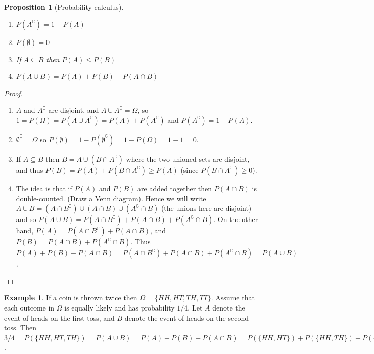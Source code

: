 \documentclass[a4paper,leqno]{article}
\numberwithin{equation}{section}
\newtheorem{prp}[equation]{Proposition}
\theoremstyle{definition}
\newtheorem{ex}[equation]{Example}
\theoremstyle{remark}
\newcommand{\union}{\cup}
\newcommand{\inter}{\cap}
\begin{document}
\begin{prp}[Probability calculus]\label{prp:probcalc}\leavevmode
  \begin{enumerate}
    \item $ P(A^\complement) = 1 - P(A) $
    \item $ P(\emptyset) = 0 $
    \item If $ A \subseteq B $ then $ P(A) \leq P(B) $
    \item $ P(A \union B) = P(A) + P(B) - P(A \inter B) $
  \end{enumerate}
\end{prp}
\begin{proof}\leavevmode
  \begin{enumerate}
    \item $ A $ and $ A^{\complement} $ are disjoint, and $ A \union A^{\complement} = \Omega $,
          so $ 1 = P(\Omega) = P(A \union A^{\complement}) = P(A) + P(A^{\complement}) $ and $ P(A^\complement) = 1 - P(A) $.
    \item $ \emptyset^\complement = \Omega $ so $ P(\emptyset) = 1 - P(\emptyset^\complement) = 1 - P(\Omega) = 1 - 1 = 0 $.
    \item If $ A \subseteq B $ then $ B = A \union (B \inter A^\complement) $ where the two unioned sets are disjoint, and
          thus $ P(B) = P(A) + P(B \inter A^\complement) \geq P(A) $ (since $ P(B \inter A^\complement) \geq 0 $).
    \item The idea is that if $ P(A) $ and $ P(B) $ are added together then $ P(A\inter B) $ is double-counted. (Draw a Venn diagram).
          Hence we will write $ A \union B = (A \inter B^\complement) \union (A \inter B) \union (A^\complement \inter B) $ (the unions
          here are disjoint) and so $ P(A \union B) = P(A \inter B^\complement) + P(A \inter B) + P(A^\complement \inter B) $. On the
          other hand, $ P(A) = P(A \inter B^\complement) + P(A \inter B) $, and $ P(B) = P(A \inter B) + P(A^\complement \inter B) $.
          Thus $ P(A) + P(B) - P(A \inter B) = P(A \inter B^\complement) + P(A \inter B) + P(A^\complement \inter B) = P(A \union B) $.
  \end{enumerate}
\end{proof}

\begin{ex}
  If a coin is thrown twice then $ \Omega = \{HH,HT,TH,TT\} $. Assume that each outcome in $ \Omega $ is equally likely and
  has probability $ 1/4 $. Let $ A $ denote the event of heads on the first toss, and $ B $ denote the event of heads on the
  second toss. Then $ 3/4 = P(\{HH,HT,TH\}) = P(A \union B) = P(A) + P(B) - P(A \inter B) = P(\{HH,HT\}) + P(\{HH,TH\}) - P(\{HH\}) = 3/4 $.
\end{ex}
\end{document}

